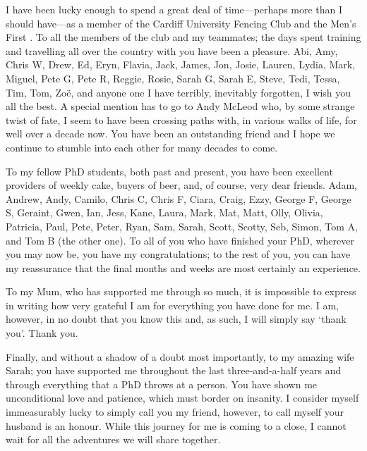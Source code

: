 \par
I have been lucky enough to spend a great deal of time---perhaps more than I should have---as a member of the Cardiff University Fencing Club and the Men's First .  To all the members of the club and my teammates; the days spent training and travelling all over the country with you have been a pleasure. Abi, Amy, Chris W, Drew, Ed, Eryn, Flavia, Jack, James, Jon, Josie, Lauren, Lydia, Mark, Miguel, Pete G, Pete R, Reggie, Rosie, Sarah G, Sarah E, Steve, Tedi, Tessa, Tim, Tom, Zo\"{e}, and anyone one I have terribly, inevitably forgotten, I wish you all the best. A special mention has to go to Andy McLeod who, by some strange twist of fate, I seem to have been crossing paths with, in various walks of life, for well over a decade now. You have been an outstanding friend and I hope we continue to stumble into each other for many decades to come.
\par
To my fellow PhD students, both past and present, you have been excellent providers of weekly cake, buyers of beer, and, of course, very dear friends. Adam, Andrew, Andy, Camilo, Chris C, Chris F, Ciara, Craig, Ezzy, George F, George S, Geraint, Gwen, Ian, Jess, Kane, Laura, Mark, Mat, Matt, Olly, Olivia, Patricia, Paul, Pete, Peter, Ryan, Sam, Sarah, Scott, Scotty, Seb, Simon, Tom A, and Tom B (the other one). To all of you who have finished your PhD, wherever you may now be, you have my congratulations; to the rest of you, you can have my reassurance that the final months and weeks are most certainly an experience.
\par
To my Mum, who has supported me through so much, it is impossible to express in writing how very grateful I am for everything you have done for me. I am, however, in no doubt that you know this and, as such, I will simply say `thank you'. Thank you.
\par
Finally, and without a shadow of a doubt most importantly, to my amazing wife Sarah; you have supported me throughout the last three-and-a-half years and through everything that a PhD throws at a person. You have shown me unconditional love and patience, which must border on insanity. I consider myself immeasurably lucky to simply call you my friend, however, to call myself your husband is an honour. While this journey for me is coming to a close, I cannot wait for all the adventures we will share together.

